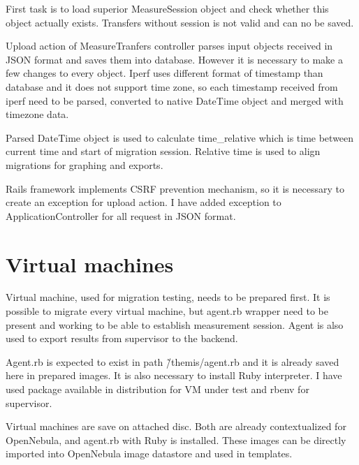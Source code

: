 First task is to load superior MeasureSession object and check whether this object actually exists. Transfers without session is not valid and can no be saved.

Upload action of MeasureTranfers controller parses input objects received in \Ac{JSON} format and saves them into database. However it is necessary to make a few changes to every object. Iperf uses different format of timestamp than database and it does not support time zone, so each timestamp received from iperf need to be parsed, converted to native DateTime object and merged with timezone data. 

Parsed DateTime object is used to calculate time\_relative which is time between current time and start of migration session. Relative time is used to align migrations for graphing and exports.

Rails framework implements \Ac{CSRF} prevention mechanism, so it is necessary to create an exception for upload action. I have added exception to ApplicationController for all request in \Ac{JSON} format.


\section{Virtual machines}
Virtual machine, used for migration testing, needs to be prepared first. It is possible to migrate every virtual machine, but agent.rb wrapper need to be present and working to be able to establish measurement session. Agent is also used to export results from supervisor to the backend.

Agent.rb is expected to exist in path {\~/themis/agent.rb} and it is already saved here in prepared images. It is also necessary to install Ruby interpreter. I have used package available in distribution for \Ac{VM} under test and rbenv for supervisor.

Virtual machines are save on attached disc. Both are already contextualized for OpenNebula, and agent.rb with Ruby is installed. These images can be directly imported into OpenNebula image datastore and used in templates.

